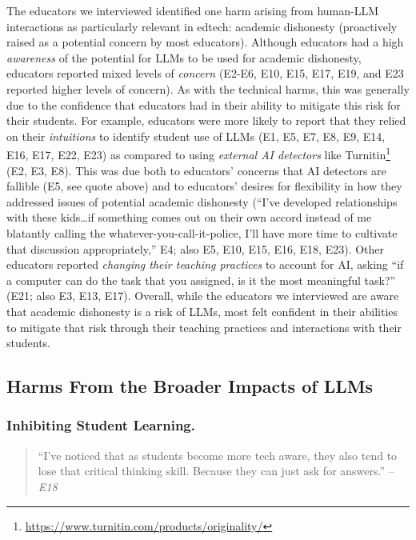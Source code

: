 \noindent The educators we interviewed identified one harm arising from human-LLM interactions as particularly relevant in edtech: academic dishonesty (proactively raised as a potential concern by most educators). Although educators had a high \textit{awareness} of the potential for LLMs to be used for academic dishonesty, educators reported mixed levels of \textit{concern} (E2-E6, E10, E15, E17, E19, and E23 reported higher levels of concern). As with the technical harms, this was generally due to the confidence that educators had in their ability to mitigate this risk for their students. For example, educators were more likely to report that they relied on their \textit{intuitions} to identify student use of LLMs (E1, E5, E7, E8, E9, E14, E16, E17, E22, E23) as compared to using \textit{external AI detectors} like Turnitin\footnote{\url{https://www.turnitin.com/products/originality/}} (E2, E3, E8). This was due both to educators' concerns that AI detectors are fallible (E5, see quote above) and to educators' desires for flexibility in how they addressed issues of potential academic dishonesty (``I've developed relationships with these kids\ldots if something comes out on their own accord instead of me blatantly calling the whatever-you-call-it-police, I'll have more time to cultivate that discussion appropriately,'' E4; also E5, E10, E15, E16, E18, E23). Other educators reported \textit{changing their teaching practices} to account for AI, asking ``if a computer can do the task that you assigned, is it the most meaningful task?'' (E21; also E3, E13, E17). Overall, while the educators we interviewed are aware that academic dishonesty is a risk of LLMs, most felt confident in their abilities to mitigate that risk through their teaching practices and interactions with their students.


\subsection{Harms From the Broader Impacts of LLMs}\label{s-results-broader-harms-educators}

\subsubsection*{Inhibiting Student Learning.}

\begin{quote}
    ``I've noticed that as students become more tech aware, they also tend to lose that critical thinking skill. Because they can just ask for answers.'' -- \textit{E18}
\end{quote}

